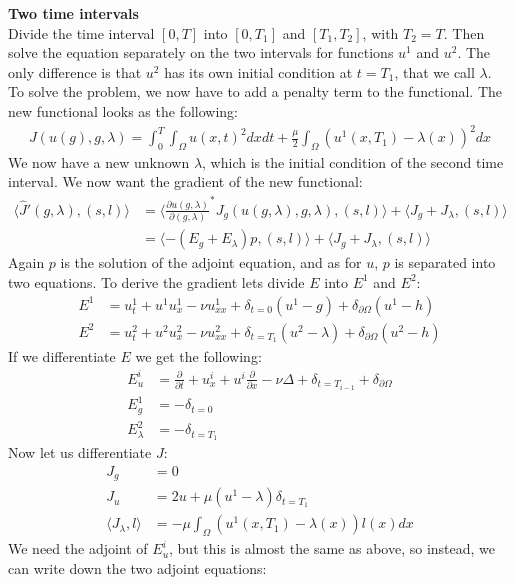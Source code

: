\documentclass[11pt,a4paper]{report}
\begin{document}
\textbf{Two time intervals}
\\
Divide the time interval $[0,T]$ into $[0,T_1]$ and $[T_1,T_2]$, with $T_2=T$. Then solve the equation separately on the two intervals for functions $u^1$ and $u^2$. The only difference is that $u^2$ has its own initial condition at $t=T_1$, that we call $\lambda$. To solve the problem, we now have to add a penalty term to the functional. The new functional looks as the following:
\begin{align*}
J(u(g),g,\lambda) = \int_0^T\int_{\Omega} u(x,t)^2 dxdt + \frac{\mu}{2}\int_{\Omega} (u^1(x,T_1)-\lambda(x))^2dx
\end{align*} 
We now have a new unknown $\lambda$, which is the initial condition of the second time interval. We now want the gradient of the new functional:
\begin{align*}
\langle \hat{J}'(g,\lambda), (s,l)\rangle &= \langle \frac{\partial u(g,\lambda)}{\partial(g,\lambda)}^* J_g(u(g,\lambda),g,\lambda), (s,l)\rangle + \langle J_g+J_{\lambda}, (s,l)\rangle \\
&=\langle -(E_g+E_{\lambda})p , (s,l)\rangle + \langle J_g+J_{\lambda}, (s,l)\rangle
\end{align*}
Again $p$ is the solution of the adjoint equation, and as for $u$, $p$ is separated into two equations. To derive the gradient lets divide $E$ into $E^1$ and $E^2$:
\begin{align*}
E^1 &= u_t^1 + u^1u_x^1 - \nu u_{xx}^1 +\delta_{t=0}(u^1-g) + \delta_{\partial \Omega}(u^1-h)\\
E^2 &= u_t^2 + u^2u_x^2 - \nu u_{xx}^2 +\delta_{t=T_1}(u^2-\lambda) + \delta_{\partial \Omega}(u^2-h)
\end{align*} 
If we differentiate $E$ we get the following:
\begin{align*}
E_u^i&=\frac{\partial}{\partial t} + u_x^i + u^i\frac{\partial}{\partial x} - \nu\Delta + \delta_{t=T_{i-1}} + \delta_{\partial \Omega} \\
E_g^1 &= -\delta_{t=0} \\
E_{\lambda}^2 &= -\delta_{t=T_1}
\end{align*}
Now let us differentiate $J$:
\begin{align*}
J_g &= 0 \\
J_u &= 2u + \mu(u^1-\lambda)\delta_{t=T_1}\\
\langle J_{\lambda},l\rangle &= -\mu\int_{\Omega} (u^1(x,T_1)-\lambda(x))l(x)dx
\end{align*}
We need the adjoint of $E_u^i$, but this is almost the same as above, so instead, we can write down the two adjoint equations:
\end{document}
